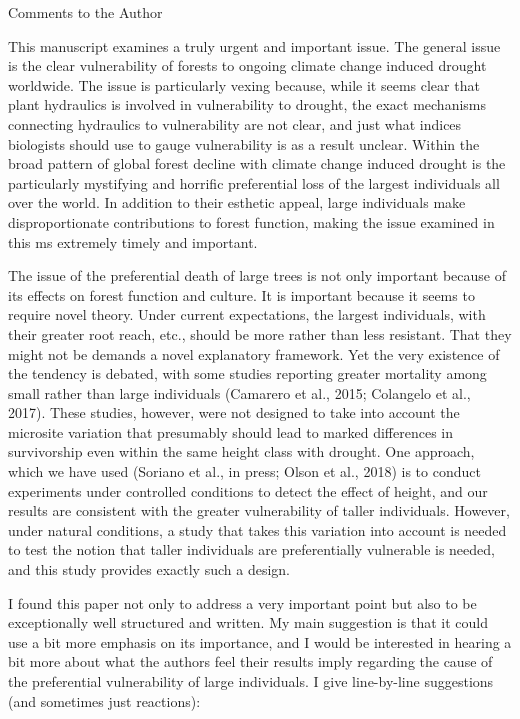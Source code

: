 \documentclass[
]{article}
\begin{document}
Comments to the Author

This manuscript examines a truly urgent and important issue. The general
issue is the clear vulnerability of forests to ongoing climate change
induced drought worldwide. The issue is particularly vexing because,
while it seems clear that plant hydraulics is involved in vulnerability
to drought, the exact mechanisms connecting hydraulics to vulnerability
are not clear, and just what indices biologists should use to gauge
vulnerability is as a result unclear. Within the broad pattern of global
forest decline with climate change induced drought is the particularly
mystifying and horrific preferential loss of the largest individuals all
over the world. In addition to their esthetic appeal, large individuals
make disproportionate contributions to forest function, making the issue
examined in this ms extremely timely and important.

The issue of the preferential death of large trees is not only important
because of its effects on forest function and culture. It is important
because it seems to require novel theory. Under current expectations,
the largest individuals, with their greater root reach, etc., should be
more rather than less resistant. That they might not be demands a novel
explanatory framework. Yet the very existence of the tendency is
debated, with some studies reporting greater mortality among small
rather than large individuals (Camarero et al., 2015; Colangelo et al.,
2017). These studies, however, were not designed to take into account
the microsite variation that presumably should lead to marked
differences in survivorship even within the same height class with
drought. One approach, which we have used (Soriano et al., in press;
Olson et al., 2018) is to conduct experiments under controlled
conditions to detect the effect of height, and our results are
consistent with the greater vulnerability of taller individuals.
However, under natural conditions, a study that takes this variation
into account is needed to test the notion that taller individuals are
preferentially vulnerable is needed, and this study provides exactly
such a design.

I found this paper not only to address a very important point but also
to be exceptionally well structured and written. My main suggestion is
that it could use a bit more emphasis on its importance, and I would be
interested in hearing a bit more about what the authors feel their
results imply regarding the cause of the preferential vulnerability of
large individuals. I give line-by-line suggestions (and sometimes just
reactions):
\end{document}
